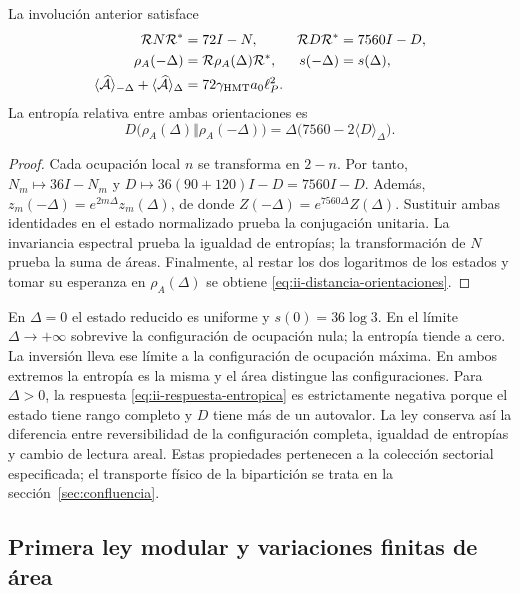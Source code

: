 \begin{theorem}
La involución anterior satisface
\begin{align}
 \mathcal R N\mathcal R^*&=72I-N,&
 \mathcal R D\mathcal R^*&=7560I-D,\\
 \rho_A(-\Delta)&=\mathcal R\rho_A(\Delta)\mathcal R^*,&
 s(-\Delta)&=s(\Delta),
 \label{eq:ii-inversion-entropia}\\
 \langle\widehat{\mathcal A}\rangle_{-\Delta}
 +\langle\widehat{\mathcal A}\rangle_\Delta
 &=72\gamma_{\mathrm{HMT}}a_0\ell_P^2.&&
 \label{eq:ii-area-complementaria}
\end{align}
La entropía relativa entre ambas orientaciones es
\begin{equation}
 D\bigl(\rho_A(\Delta)\Vert\rho_A(-\Delta)\bigr)
 =\Delta\bigl(7560-2\langle D\rangle_\Delta\bigr).
 \label{eq:ii-distancia-orientaciones}
\end{equation}
\end{theorem}
\begin{proof}
Cada ocupación local $n$ se transforma en $2-n$. Por tanto,
$N_m\mapsto36I-N_m$ y
$D\mapsto36(90+120)I-D=7560I-D$.
Además, $z_m(-\Delta)=e^{2m\Delta}z_m(\Delta)$,
de donde $Z(-\Delta)=e^{7560\Delta}Z(\Delta)$.
Sustituir ambas identidades en el estado normalizado prueba la
conjugación unitaria. La invariancia espectral prueba la igualdad
de entropías; la transformación de $N$ prueba la suma de áreas.
Finalmente, al restar los dos logaritmos de los estados y tomar
su esperanza en $\rho_A(\Delta)$ se obtiene
\eqref{eq:ii-distancia-orientaciones}.
\end{proof}

En $\Delta=0$ el estado reducido es uniforme y
$s(0)=36\log3$. En el límite $\Delta\to+\infty$ sobrevive
la configuración de ocupación nula; la entropía tiende a cero.
La inversión lleva ese límite a la configuración de ocupación máxima.
En ambos extremos la entropía es la misma y el área distingue las
configuraciones. Para $\Delta>0$, la respuesta
\eqref{eq:ii-respuesta-entropica} es estrictamente negativa porque
el estado tiene rango completo y $D$ tiene más de un autovalor.
La ley conserva así la diferencia entre reversibilidad de la
configuración completa, igualdad de entropías y cambio de lectura areal.
Estas propiedades pertenecen a la colección sectorial especificada;
el transporte físico de la bipartición se trata en
la sección~\ref{sec:confluencia}.

\subsection{Primera ley modular y variaciones finitas de área}
\label{sec:ii-area-ley-modular}

